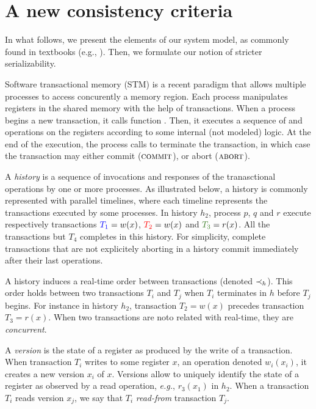 \section{A new consistency criteria}

In what follows, we present the elements of our system model, as commonly found in textbooks (e.g., \cite{}).
Then, we formulate our notion of stricter serializability.

Software transactional memory (STM) is a recent paradigm that allows multiple processes to access concurently a memory region.
Each process manipulates registers in the shared memory with the help of transactions.
When a process begins a new transaction, it calls function \stmBeginFunction.
Then, it executes a sequence of \stmReadFunction and \stmWriteFunction operations on the registers according to some internal (not modeled) logic.
At the end of the execution, the process calls \stmTryCommitFunction to terminate the transaction, in which case the transaction may either commit ($\text{\textsc{commit}}$), or abort ($\text{\textsc{abort}}$).

A \emph{history} is a sequence of invocations and responses of the tranasctional operations by one or more processes.
As illustrated below, a history is commonly represented with parallel timelines, where each timeline represents the transactions executed by some processes.
In history $h_2$, process $p$, $q$ and $r$ execute respectively transactions ${\color{blue}{T_1}}=w(x)$, ${\color{red}{T_2}}=w(x)$ and ${\color{OliveGreen}{T_3}}=r(x)$.
All the transactions but $T_4$ completes in this history.
For simplicity, complete transactions that are not explicitely aborting in a history commit immediately after their last operations.



A history induces a real-time order between transactions (denoted $\hb_h$).
This order holds between two transactions $T_i$ and $T_j$ when $T_i$ terminates in $h$ before $T_j$ begins.
For instance in history $h_2$, transaction $T_2=w(x)$ precedes transaction $T_3=r(x)$.
When two transactions are noto related with real-time, they are \emph{concurrent}.

A \emph{version} is the state of a register as produced by the write of a transaction.
When transaction $T_i$ writes to some register $x$, an operation denoted $w_i(x_i)$, it creates a new version $x_i$ of $x$.
Versions allow to uniquely identify the state of a register as observed by a read operation, \emph{e.g.}, $r_3(x_1)$ in $h_2$.
When a transaction $T_i$ reads version $x_j$, we say that $T_i$ \emph{read-from} transaction $T_j$.

